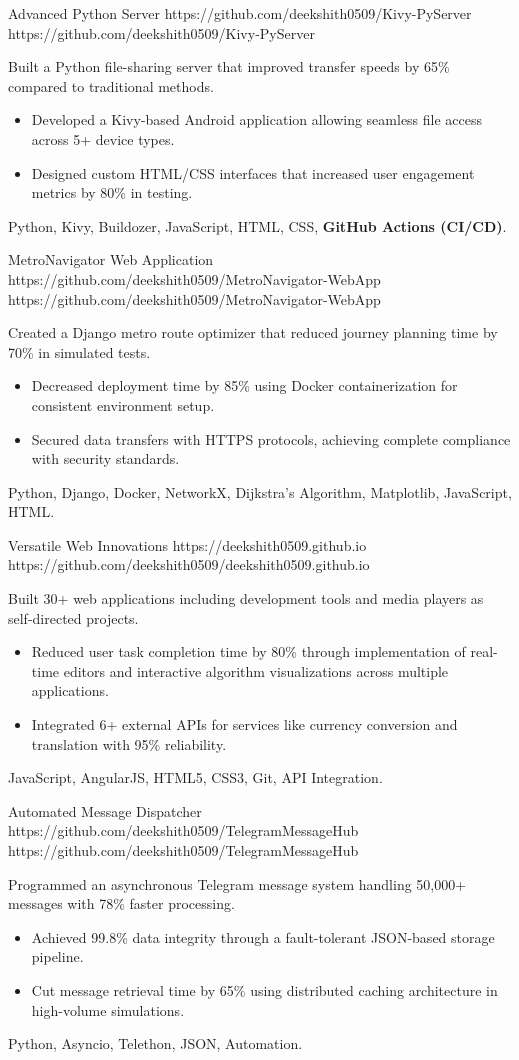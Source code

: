 \documentclass[a4paper,10pt]{article}
\begin{document}
\vspace{5pt}
\projectentry
    {Advanced Python Server}
    {https://github.com/deekshith0509/Kivy-PyServer}
    {https://github.com/deekshith0509/Kivy-PyServer}
    {Built a Python file-sharing server that improved transfer speeds by 65\% compared to traditional methods.
    \begin{itemize}
        \item Developed a Kivy-based Android application allowing seamless file access across 5+ device types.
        \item Designed custom HTML/CSS interfaces that increased user engagement metrics by 80\% in testing.
    \end{itemize}}{Python, Kivy, Buildozer, JavaScript, HTML, CSS, \textbf{GitHub Actions (CI/CD)}.}

\projectentry
{MetroNavigator Web Application}
{https://github.com/deekshith0509/MetroNavigator-WebApp}
{https://github.com/deekshith0509/MetroNavigator-WebApp}
{Created a Django metro route optimizer that reduced journey planning time by 70\% in simulated tests.
\begin{itemize}
    \item Decreased deployment time by 85\% using Docker containerization for consistent environment setup.
    \item Secured data transfers with HTTPS protocols, achieving complete compliance with security standards.
\end{itemize}
}{Python, Django, Docker, NetworkX, Dijkstra’s Algorithm, Matplotlib, JavaScript, HTML.}

\projectentry
{Versatile Web Innovations}
{https://deekshith0509.github.io}
{https://github.com/deekshith0509/deekshith0509.github.io}
{Built 30+ web applications including development tools and media players as self-directed projects.
\begin{itemize}
    \item Reduced user task completion time by 80\% through implementation of real-time editors and interactive algorithm visualizations across multiple applications.
    \item Integrated 6+ external APIs for services like currency conversion and translation with 95\% reliability.
\end{itemize}
}{JavaScript, AngularJS, HTML5, CSS3, Git, API Integration.}


\projectentry
{Automated Message Dispatcher}
{https://github.com/deekshith0509/TelegramMessageHub}
{https://github.com/deekshith0509/TelegramMessageHub}
{Programmed an asynchronous Telegram message system handling 50,000+ messages with 78\% faster processing.
\begin{itemize}
    \item Achieved 99.8\% data integrity through a fault-tolerant JSON-based storage pipeline.
    \item Cut message retrieval time by 65\% using distributed caching architecture in high-volume simulations.
\end{itemize}
}{Python, Asyncio, Telethon, JSON, Automation.}
\end{document}
